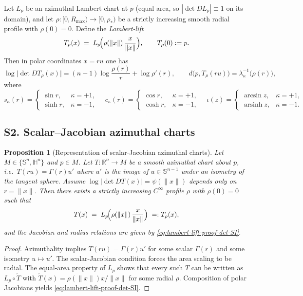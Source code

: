 \documentclass{article}
\newtheorem{proposition}{Proposition}
\theoremstyle{definition}
\theoremstyle{remark}
\newcommand{\SSS}{\mathbb{S}}
\newcommand{\HH}{\mathbb{H}}
\newcommand{\ars}{\iota}  %
\begin{document}
Let $L_p$ be an azimuthal Lambert chart at $p$ (equal-area, so $|\det DL_p|\equiv1$ on its domain),
and let $\rho:[0,R_{\max})\to[0,\rho_\ast)$ be a strictly increasing smooth radial profile with
$\rho(0)=0$. Define the \emph{Lambert-lift}
\[
T_\rho(x)\;=\;L_p\!\Bigl(\rho(\|x\|)\,\frac{x}{\|x\|}\Bigr),\qquad T_\rho(0):=p.
\]
Then in polar coordinates $x=ru$ one has
\begin{equation}
\log\bigl|\det DT_\rho(x)\bigr|
=(n-1)\log\frac{\rho(r)}{r}+\log\rho'(r),
\qquad
d\bigl(p,T_\rho(ru)\bigr)
=\lambda_\kappa^{-1}\!\bigl(\rho(r)\bigr),
\label{eq:lambert-lift-proof-det-SI}
\end{equation}
where
\[
s_\kappa(r)=
\begin{cases}
\sin r,&\kappa=+1,\\[2pt]
\sinh r,&\kappa=-1,
\end{cases}
\quad
c_\kappa(r)=
\begin{cases}
\cos r,&\kappa=+1,\\[2pt]
\cosh r,&\kappa=-1,
\end{cases}
\quad
\ars(z)=
\begin{cases}
\arcsin z,&\kappa=+1,\\[2pt]
\operatorname{arsinh} z,&\kappa=-1.
\end{cases}
\]

\subsection*{S2. Scalar--Jacobian azimuthal charts}

\begin{proposition}[Representation of scalar-Jacobian azimuthal charts]
Let $M\in\{\SSS^n,\HH^n\}$ and $p\in M$. Let
$T:\mathbb R^n\to M$ be a smooth azimuthal chart about $p$, i.e.\
$T(ru)=\Gamma(r)u'$ where $u'$ is the image of $u\in\SSS^{n-1}$ under an isometry of the tangent
sphere. Assume $\log|\det DT(x)| = \psi(\|x\|)$ depends only on $r=\|x\|$. Then there exists a
strictly increasing $C^\infty$ profile $\rho$ with $\rho(0)=0$ such that
\[
T(x) \;=\; L_p\!\Bigl(\rho(\|x\|)\,\frac{x}{\|x\|}\Bigr) \;=:T_\rho(x),
\]
and the Jacobian and radius relations are given by
\eqref{eq:lambert-lift-proof-det-SI}.
\end{proposition}

\begin{proof}
Azimuthality implies $T(ru)=\Gamma(r)u'$ for some scalar $\Gamma(r)$ and some isometry
$u\mapsto u'$. The scalar-Jacobian condition forces the area scaling to be radial.
The equal-area property of $L_p$ shows that every such $T$ can be written as $L_p\circ\tilde T$
with $\tilde T(x)=\rho(\|x\|)x/\|x\|$ for some radial $\rho$. Composition of polar Jacobians yields
\eqref{eq:lambert-lift-proof-det-SI}.
\end{proof}
\end{document}
